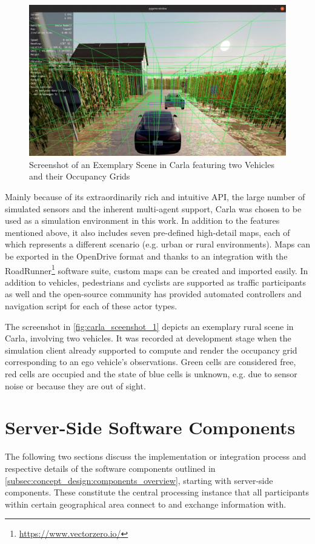 \begin{figure}[h]
	\centering
	\includegraphics[width=0.9\linewidth]{98_images/carla_screenshot_1}
	\caption[Screenshot of an Exemplary Carla Scene]{Screenshot of an Exemplary Scene in Carla featuring two Vehicles and their Occupancy Grids}
	\label{fig:carla_sceenshot_1}
\end{figure}

Mainly because of its extraordinarily rich and intuitive API, the large number of simulated sensors and the inherent multi-agent support, Carla was chosen to be used as a simulation environment in this work. In addition to the features mentioned above, it also includes seven pre-defined high-detail maps, each of which represents a different scenario (e.g. urban or rural environments). Maps can be exported in the OpenDrive format and thanks to an integration with the RoadRunner\footnote{\url{https://www.vectorzero.io/}} software suite, custom maps can be created and imported easily. In addition to vehicles, pedestrians and cyclists are supported as traffic participants as well and the open-source community has provided automated controllers and navigation script for each of these actor types.

The screenshot in \autoref{fig:carla_sceenshot_1} depicts an exemplary rural scene in Carla, involving two vehicles. It was recorded at development stage when the simulation client already supported to compute and render the occupancy grid corresponding to an ego vehicle's observations. Green cells are considered free, red cells are occupied and the state of blue cells is unknown, e.g. due to sensor noise or because they are out of sight.

\section{Server-Side Software Components}
\label{sec:implementation:server_side_software_components}
The following two sections discuss the implementation or integration process and respective details of the software components outlined in \autoref{subsec:concept_design:components_overview}, starting with server-side components. These constitute the central processing instance that all participants within certain geographical area connect to and exchange information with. 

